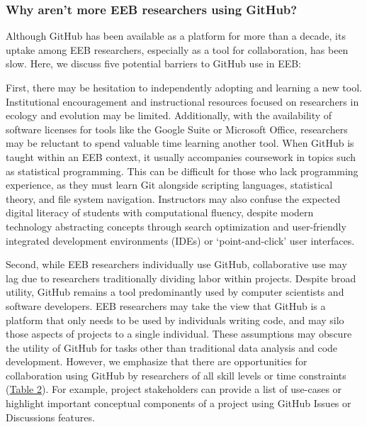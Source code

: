 \hypertarget{why-arent-more-eeb-researchers-using-github}{%
\subsubsection{Why aren't more EEB researchers using GitHub?}\label{why-arent-more-eeb-researchers-using-github}}

Although GitHub has been available as a platform for more than a decade, its uptake among EEB researchers, especially as a tool for collaboration, has been slow.
Here, we discuss five potential barriers to GitHub use in EEB:

First, there may be hesitation to independently adopting and learning a new tool.
Institutional encouragement and instructional resources focused on researchers in ecology and evolution may be limited.
Additionally, with the availability of software licenses for tools like the Google Suite or Microsoft Office, researchers may be reluctant to spend valuable time learning another tool.
When GitHub is taught within an EEB context, it usually accompanies coursework in topics such as statistical programming.
This can be difficult for those who lack programming experience, as they must learn Git alongside scripting languages, statistical theory, and file system navigation.
Instructors may also confuse the expected digital literacy of students with computational fluency, despite modern technology abstracting concepts through search optimization and user-friendly integrated development environments (IDEs) or `point-and-click' user interfaces.

Second, while EEB researchers individually use GitHub, collaborative use may lag due to researchers traditionally dividing labor within projects.
Despite broad utility, GitHub remains a tool predominantly used by computer scientists and software developers.
EEB researchers may take the view that GitHub is a platform that only needs to be used by individuals writing code, and may silo those aspects of projects to a single individual.
These assumptions may obscure the utility of GitHub for tasks other than traditional data analysis and code development.
However, we emphasize that there are opportunities for collaboration using GitHub by researchers of all skill levels or time constraints (\protect\hyperlink{tbl:roles}{Table 2}).
For example, project stakeholders can provide a list of use-cases or highlight important conceptual components of a project using GitHub Issues or Discussions features.


